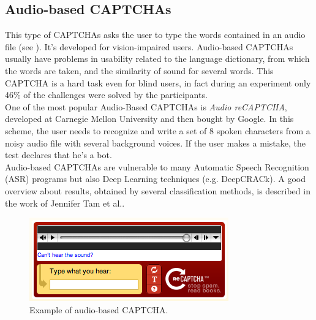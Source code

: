 \subsection{Audio-based CAPTCHAs}
This type of CAPTCHAs asks the user to type the words contained in an audio file (see ). It's developed for vision-impaired users. Audio-based CAPTCHAs usually have problems in usability related to the language dictionary, from which the words are taken, and the similarity of sound for several words. This CAPTCHA is a hard task even for blind users, in fact  during an experiment only 46\% of the challenges were solved by the participants\cite{usability_audio}.\\
One of the most popular Audio-Based CAPTCHAs is \textit{Audio reCAPTCHA}, developed at Carnegie Mellon University and then bought by Google. In this scheme, the user needs to recognize and write a set of 8 spoken characters from a noisy audio file with several background voices. If the user makes a mistake, the test declares that he's a bot.\\
Audio-based CAPTCHAs are vulnerable to many Automatic Speech Recognition (ASR) programs\cite{improving_audio} but also Deep Learning techniques (e.g. DeepCRACk\cite{DeepCRACk}). A good overview about results, obtained by several classification methods, is described in the work of Jennifer Tam et al.\cite{break_audio}.
\begin{figure}[h]
     \centering
     \includegraphics[width=.5\linewidth]{Images/StateOfArt/audio_CAPTCHA}
     \caption{\footnotesize{Example of audio-based CAPTCHA.}}\label{soa:audio_CAPTCHA}
\end{figure}


